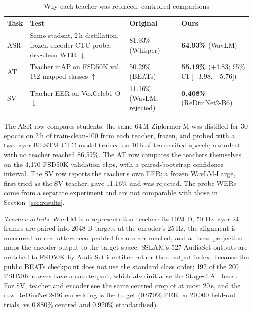 \documentclass[lettersize,journal]{IEEEtran}
\begin{document}
\begin{table}[!htbp]
  \caption{Why each teacher was replaced: controlled comparisons}
  \label{tab:teachers}
  \centering
  \footnotesize
  \setlength{\tabcolsep}{3pt}
  \begin{tabular}{lL{3.3cm}L{1.45cm}L{1.95cm}}
    \toprule
    Task & Test & Original & Ours \\
    \midrule
    ASR & Same student, 2\,h distillation, frozen-encoder CTC probe, dev-clean WER $\downarrow$ & 81.93\% (Whisper) & \textbf{64.93\%} (WavLM) \\
    AT  & Teacher mAP on FSD50K val, 192 mapped classes $\uparrow$ & 50.29\% (BEATs) & \textbf{55.19\%} ($+$4.83; 95\% CI [$+$3.98, $+$5.76]) \\
    SV  & Teacher EER on VoxCeleb1-O $\downarrow$ & 11.16\% (WavLM, rejected) & \textbf{0.408\%} (ReDimNet2-B6) \\
    \bottomrule
  \end{tabular}
\end{table}

The ASR row compares students: the same 64\,M Zipformer-M was distilled for 30 epochs on 2\,h of train-clean-100
from each teacher, frozen, and probed with a two-layer BiLSTM CTC model trained on 10\,h of transcribed speech; a
student with no teacher reached 86.59\%. The AT row compares the teachers themselves on the 4,170 FSD50K validation
clips, with a paired-bootstrap confidence interval. The SV row reports the teacher's own EER; a frozen WavLM-Large,
first tried as the SV teacher, gave 11.16\% and was rejected. The probe WERs come from a separate experiment and are
not comparable with those in Section~\ref{sec:results}.

\textit{Teacher details.} WavLM is a representation teacher: its 1024-D, 50-Hz layer-24 frames are paired into
2048-D targets at the encoder's 25\,Hz, the alignment is measured on real utterances, padded frames are masked, and a
linear projection maps the encoder output to the target space. SSLAM's 527 AudioSet outputs are matched to FSD50K by
AudioSet identifier rather than output index, because the public BEATs checkpoint does not use the standard class
order; 192 of the 200 FSD50K classes have a counterpart, which also initialise the Stage-2 AT head. For SV, teacher and
encoder see the same centred crop of at most 20\,s, and the raw ReDimNet2-B6 embedding is the target (0.870\% EER on
20,000 held-out trials, vs 0.880\% centred and 0.920\% standardised).
\end{document}
